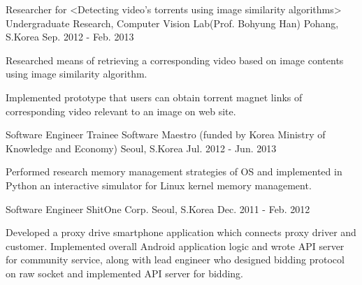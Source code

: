 \begin{cventries}
    \cventry
    {Researcher for <Detecting video’s torrents using image similarity algorithms>} %
    {Undergraduate Research, Computer Vision Lab(Prof. Bohyung Han)} %
    {Pohang, S.Korea} %
    {Sep. 2012 - Feb. 2013} %
    {
        \begin{cvitems} %
            \item {Researched means of retrieving a corresponding video based on image contents using image similarity algorithm.}
            \item {Implemented prototype that users can obtain torrent magnet links of corresponding video relevant to an image on web site.}
        \end{cvitems}
    }

    \cventry
    {Software Engineer Trainee} %
    {Software Maestro (funded by Korea Ministry of Knowledge and Economy)} %
    {Seoul, S.Korea} %
    {Jul. 2012 - Jun. 2013} %
    {
        \begin{cvitems} %
            \item {Performed research memory management strategies of OS and implemented in Python an interactive simulator for Linux kernel memory management.}
        \end{cvitems}
    }

    \cventry
    {Software Engineer} %
    {ShitOne Corp.} %
    {Seoul, S.Korea} %
    {Dec. 2011 - Feb. 2012} %
    {
        \begin{cvitems} %
            \item {Developed a proxy drive smartphone application which connects proxy driver and customer. Implemented overall Android application logic and wrote API server for community service, along with lead engineer who designed bidding protocol on raw socket and implemented API server for bidding.}
        \end{cvitems}
    }


\end{cventries}
